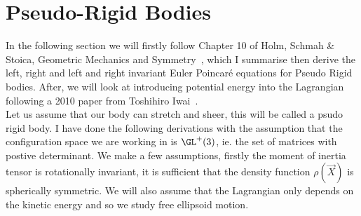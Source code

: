 
\section{Pseudo-Rigid Bodies}
In the following section we will firstly follow Chapter 10 of Holm, Schmah \& Stoica, Geometric Mechanics and Symmetry~\cite{holm_schmah_stoica_2009}, which I summarise then derive the left, right and left and right invariant Euler Poincar\'e equations for Pseudo Rigid bodies. After, we will look at introducing potential energy into the Lagrangian following a 2010 paper from Toshihiro Iwai~\cite{Iwai_2010}.\\

\noindent
Let us assume that our body can stretch and sheer, this will be called a psudo rigid body. I have done the following derivations with the assumption that the configuration space we are working in is $\GL^+(3)$, ie. the set of matrices with postive determinant. We make a few assumptions, firstly the moment of inertia tensor is rotationally invariant, it is sufficient that the density function $\rho(\vec X)$ is spherically symmetric. We will also assume that the Lagrangian only depends on the kinetic energy and so we study free ellipsoid motion.\\


